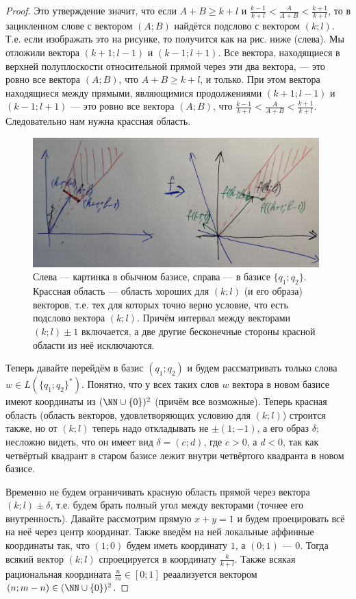 \documentclass[12pt,a4paper]{article}
\begin{document}
\begin{problem}{8}
\begin{enumerate}
\begin{proof}
                    Это утверждение значит, что если $A+B \geqslant k+l$ и $\frac{k-1}{k+l} < \frac{A}{A+B} < \frac{k+1}{k+l}$, то в зацикленном слове с вектором $(A; B)$ найдётся подслово с вектором $(k; l)$. Т.е. если изображать это на рисунке, то получится как на рис. ниже (слева). Мы отложили вектора $(k+1; l-1)$ и $(k-1; l+1)$. Все вектора, находящиеся в верхней полуплоскости относительной прямой через эти два вектора, --- это ровно все вектора $(A; B)$, что $A+B \geqslant k+l$, и только. При этом вектора находящиеся между прямыми, являющимися продолжениями $(k+1; l-1)$ и $(k-1; l+1)$ --- это ровно все вектора $(A; B)$, что $\frac{k-1}{k+l} < \frac{A}{A+B} < \frac{k+1}{k+l}$. Следовательно нам нужна крассная область.
                    \begin{figure}[H]
                        \centering
                        \includegraphics[height=5cm]{TI-HW-006-5.jpg}
                        \caption{Слева --- картинка в обычном базисе, справа --- в базисе $\{q_1; q_2\}$. Крассная область --- область хороших для $(k; l)$ (и его образа) векторов, т.е. тех для которых точно верно условие, что есть подслово вектора $(k; l)$. Причём интервал между векторами $(k; l) \pm 1$ включается, а две другие бесконечные стороны красной области из неё исключаются.}
                    \end{figure}
                    
                    Теперь давайте перейдём в базис $(q_1; q_2)$ и будем рассматривать только слова $w \in L(\{q_1; q_2\}^*)$. Понятно, что у всех таких слов $w$ вектора в новом базисе имеют координаты из $(\NN \cup \{0\})^2$ (причём все возможные). Теперь красная область (область векторов, удовлетворяющих условию для $(k; l)$) строится также, но от $(k; l)$ теперь надо откладывать не $\pm (1; -1)$, а его образ $\delta$; несложно видеть, что он имеет вид $\delta = (c;d)$, где $c > 0$, а $d < 0$, так как четвёртый квадрант в старом базисе лежит внутри четвёртого квадранта в новом базисе.

                    Временно не будем ограничивать красную область прямой через вектора $(k; l) \pm \delta$, т.е. будем брать полный угол между векторами (точнее его внутренность). Давайте рассмотрим прямую $x+y = 1$ и будем проецировать всё на неё через центр координат. Также введём на ней локальные аффинные координаты так, что $(1;0)$ будем иметь координату $1$, а $(0; 1)$ --- $0$. Тогда всякий вектор $(k; l)$ спроецируется в координату $\frac{k}{k+l}$. Также всякая рациональная координата $\frac{n}{m} \in [0; 1]$ реаализуется вектором $(n; m - n) \in (\NN \cup \{0\})^2$.
                    

\end{proof}
\end{enumerate}
\end{problem}
\end{document}
